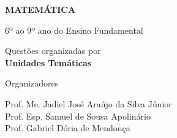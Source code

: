 \begin{titlepage}
\begin{minipage}{0.57\textwidth}
\vspace{0.5cm}

{\color{AzulPrincipal}
\fontsize{38}{42}\selectfont
\bfseries MATEMÁTICA
}

\vspace{0.5cm}

{\color{CinzaTexto}
\Large
6º ao 9º ano do Ensino Fundamental
}

\vspace{1.5cm}

\begin{tcolorbox}[
    colback=white,
    colframe=Turquesa,
    boxrule=1pt,
    arc=8pt
]
\centering
\large
Questões organizadas por\\
\textbf{Unidades Temáticas}
\end{tcolorbox}

\vspace{10cm}

{\color{CinzaTexto}
\large
Organizadores
\vspace{30pt}

Prof. Me. Jadiel José Araújo da Silva Júnior \\
Prof. Esp. Samuel de Sousa Apolinário \\
Prof. Gabriel Dória de Mendonça
}

\end{minipage}

\end{titlepage}

\cleardoublepage